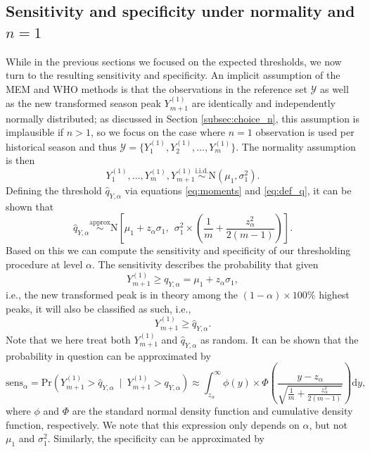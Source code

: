 \documentclass{article}
\begin{document}
\subsection{Sensitivity and specificity under normality and $n = 1$}
\label{subsec:theory_sensitivity}

While in the previous sections we focused on the expected thresholds, we now turn to the resulting sensitivity and specificity. An implicit assumption of the MEM and WHO methods is that the observations in the reference set $\mathcal{Y}$ as well as the new transformed season peak $Y_{m + 1}^{(1)}$ are identically and independently normally distributed; as discussed in Section \ref{subsec:choice_n}, this assumption is implausible if $n > 1$, so we focus on the case where $n = 1$ observation is used per historical season and thus $\mathcal{Y} = \{Y_1^{(1)}, Y_2^{(1)}, \dots, Y_m^{(1)}\}$. The normality assumption is then
$$
Y_1^{(1)}, \dots, Y_m^{(1)}, Y_{m + 1}^{(1)} \stackrel{\text{i.i.d.}}{\sim} \text{N}(\mu_1, \sigma^2_1).
$$
Defining the threshold $\hat{q}_{Y, \alpha}$ via equations \eqref{eq:moments} and \eqref{eq:def_q}, it can be shown that
\begin{equation}
\hat{q}_{Y, \alpha} \stackrel{\text{approx}}{\sim} \text{N}\left[\mu_1 + z_\alpha \sigma_1,\ \ \sigma_1^2 \times \left(\frac{1}{m} + \frac{z_\alpha^2}{2(m - 1)} \right) \right].
\label{eq:q_Y}
\end{equation}
Based on this we can compute the sensitivity and specificity of our thresholding procedure at level $\alpha$. The sensitivity describes the probability that given
$$
Y_{m + 1}^{(1)} \geq q_{Y, \alpha} = \mu_1 + z_\alpha \sigma_1,
$$
i.e., the new transformed peak is in theory among the $(1 - \alpha) \times 100\%$ highest peaks, it will also be classified as such, i.e.,
$$
Y_{m + 1}^{(1)} \geq \hat{q}_{Y, \alpha}.
$$
Note that we here treat both $Y_{m + 1}^{(1)}$ and $\hat{q}_{Y, \alpha}$ as random. It can be shown that the probability in question can be approximated by
\begin{equation}
\text{sens}_\alpha = \text{Pr}(Y_{m + 1}^{(1)} > \hat{q}_{Y, \alpha} \ \mid \ Y_{m + 1}^{(1)} > q_{Y, \alpha}) \approx \int_{z_\alpha}^\infty \phi(y) \times \Phi\left(\frac{y - z_\alpha}{\sqrt{\frac{1}{m} + \frac{z_\alpha^2}{2(m - 1)}}}\right) \text{d}y,
\label{eq:sens}
\end{equation}
where $\phi$ and $\Phi$ are the standard normal density function and cumulative density function, respectively. We note that this expression only depends on $\alpha$, but not $\mu_1$ and $\sigma^2_1$. Similarly, the specificity can be approximated by
\end{document}
